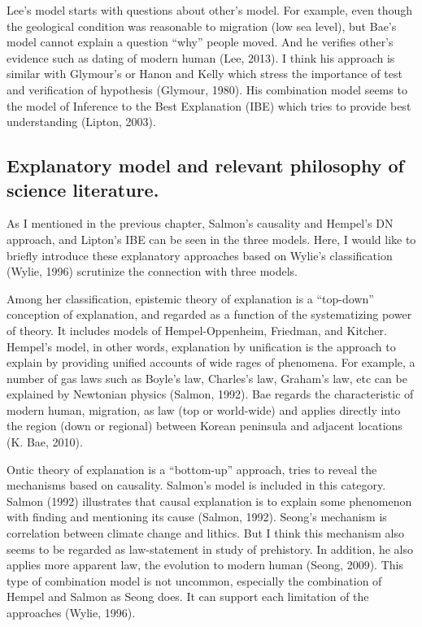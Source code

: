 \documentclass[american,man]{apa6}
\begin{document}
Lee's model starts with questions about other's model. For example, even
though the geological condition was reasonable to migration (low sea
level), but Bae's model cannot explain a question \enquote{why} people
moved. And he verifies other's evidence such as dating of modern human
(Lee, 2013). I think his approach is similar with Glymour's or Hanon and
Kelly which stress the importance of test and verification of hypothesis
(Glymour, 1980). His combination model seems to the model of Inference
to the Best Explanation (IBE) which tries to provide best understanding
(Lipton, 2003).

\subsection{Explanatory model and relevant philosophy of science
literature.}\label{explanatory-model-and-relevant-philosophy-of-science-literature.}

As I mentioned in the previous chapter, Salmon's causality and Hempel's
DN approach, and Lipton's IBE can be seen in the three models. Here, I
would like to briefly introduce these explanatory approaches based on
Wylie's classification (Wylie, 1996) scrutinize the connection with
three models.

Among her classification, epistemic theory of explanation is a
\enquote{top-down} conception of explanation, and regarded as a function
of the systematizing power of theory. It includes models of
Hempel-Oppenheim, Friedman, and Kitcher. Hempel's model, in other words,
explanation by unification is the approach to explain by providing
unified accounts of wide rages of phenomena. For example, a number of
gas laws such as Boyle's law, Charles's law, Graham's law, etc can be
explained by Newtonian physics (Salmon, 1992). Bae regards the
characteristic of modern human, migration, as law (top or world-wide)
and applies directly into the region (down or regional) between Korean
peninsula and adjacent locations (K. Bae, 2010).

Ontic theory of explanation is a \enquote{bottom-up} approach, tries to
reveal the mechanisms based on causality. Salmon's model is included in
this category. Salmon (1992) illustrates that causal explanation is to
explain some phenomenon with finding and mentioning its cause (Salmon,
1992). Seong's mechanism is correlation between climate change and
lithics. But I think this mechanism also seems to be regarded as
law-statement in study of prehistory. In addition, he also applies more
apparent law, the evolution to modern human (Seong, 2009). This type of
combination model is not uncommon, especially the combination of Hempel
and Salmon as Seong does. It can support each limitation of the
approaches (Wylie, 1996).
\end{document}
